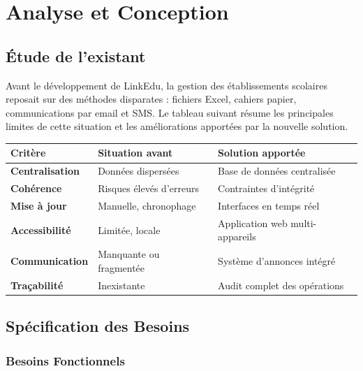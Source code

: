 \documentclass[12pt,a4paper]{report}
\begin{document}
    \chapter{Analyse et Conception}

    \section{Étude de l'existant}

    Avant le développement de LinkEdu, la gestion des établissements scolaires reposait sur des méthodes disparates : fichiers Excel, cahiers papier, communications par email et SMS. Le tableau suivant résume les principales limites de cette situation et les améliorations apportées par la nouvelle solution.

    \vspace{0.4cm}
    \begin{center}
    \begin{tabular}{>{\bfseries}p{4cm} p{5cm} p{5cm}}
    \toprule
    \textbf{Critère} & \textbf{Situation avant} & \textbf{Solution apportée} \\
    \midrule
    Centralisation & Données dispersées & Base de données centralisée \\
    \midrule
    Cohérence & Risques élevés d'erreurs & Contraintes d'intégrité \\
    \midrule
    Mise à jour & Manuelle, chronophage & Interfaces en temps réel \\
    \midrule
    Accessibilité & Limitée, locale & Application web multi-appareils \\
    \midrule
    Communication & Manquante ou fragmentée & Système d'annonces intégré \\
    \midrule
    Traçabilité & Inexistante & Audit complet des opérations \\
    \bottomrule
    \end{tabular}
    \end{center}
    \vspace{0.4cm}

    \section{Spécification des Besoins}

    \subsection{Besoins Fonctionnels}
\end{document}
